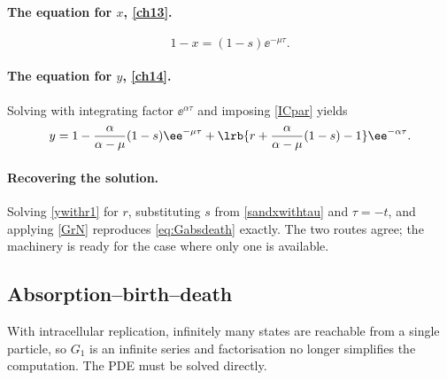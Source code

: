 \paragraph{The equation for \(x\), \eqref{ch13}.}
\begin{equation}
\label{sandxwithtau}
1-x = (1-s)\ee^{-\mu\tau} .
\end{equation}

\paragraph{The equation for \(y\), \eqref{ch14}.}
Solving with integrating factor \(\ee^{\alpha\tau}\) and imposing \cref{ICpar} yields
\begin{equation}
\label{ywithr1}
y = 1 - \frac{\alpha}{\alpha-\mu}(1-s)\ee^{-\mu\tau} + \lrb{r + \frac{\alpha}{\alpha-\mu}(1-s) - 1}\ee^{-\alpha\tau}.
\end{equation}

\paragraph{Recovering the solution.}
Solving \cref{ywithr1} for \(r\), substituting \(s\) from \cref{sandxwithtau} and \(\tau=-t\), and applying \cref{GrN} reproduces \cref{eq:Gabsdeath} exactly. The two routes agree; the machinery is ready for the case where only one is available.

\subsection{Absorption--birth--death}
\label{sec:absbirthdeath}

With intracellular replication, infinitely many states are reachable from a single particle, so \(G_1\) is an infinite series and factorisation no longer simplifies the computation. The PDE must be solved directly.


